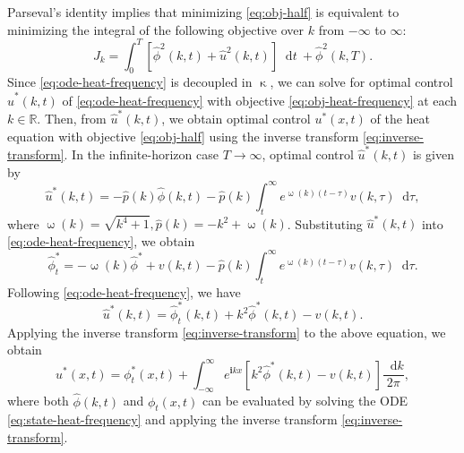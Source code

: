 \documentclass[journal,twoside,web]{ieeecolor}
\newcommand{\RR}{\mathbb{R}}
\newcommand{\state}{\phi}
\newcommand{\statehat}{\hat{\state}}
\newcommand{\im}{\mathbf{i}}
\newcommand*\diff{\mathop{}\!\mathrm{d}}
\newcommand{\wcomplex}{\upomega}
\newcommand{\kcomplex}{\upkappa}
\begin{document}
Parseval's identity implies that minimizing \eqref{eq:obj-half} is equivalent to minimizing the integral of the following objective over $k$ from $-\infty$ to $\infty$:
\begin{equation}\label{eq:obj-heat-frequency}
	J_k =\int_0^T\left[\hat{\state}^2(k,t)+\hat{u}^2(k,t)\right] \diff t\ + \hat{\state}^2(k,T).
\end{equation}
Since \eqref{eq:ode-heat-frequency} is decoupled in $\kcomplex$, we can solve for optimal control $\hat{u}^*(k,t)$ of \eqref{eq:ode-heat-frequency} with objective \eqref{eq:obj-heat-frequency} at each $k\in\RR$. Then,
from $\hat{u}^*(k,t)$, we obtain optimal control $u^*(x,t)$ of the heat equation with objective \eqref{eq:obj-half} using the inverse transform \eqref{eq:inverse-transform}.
In the infinite-horizon case $T\to\infty$, optimal control $\hat{u}^*(k,t)$ is given by
\begin{equation*}
	\hat{u}^*(k,t) = -\hat{p}(k)\statehat(k,t) - \hat{p}(k)\int_{t}^{\infty} e^{\wcomplex(k)(t-\tau)}v(k,\tau)\diff \tau,
\end{equation*}
where $\wcomplex(k)=\sqrt{k^4+1}, \hat{p}(k)=-k^2 + \wcomplex(k)$.
Substituting $\hat{u}^*(k,t)$ into \eqref{eq:ode-heat-frequency}, we obtain
\begin{equation}\label{eq:state-heat-frequency}
		\statehat_t^* = -\wcomplex(k)\statehat^* + v(k,t) - \hat{p}(k)\int_{t}^{\infty} e^{\wcomplex(k)(t-\tau)}v(k,\tau)\diff \tau.
\end{equation}
Following \eqref{eq:ode-heat-frequency}, we have
\begin{equation*}
	\hat{u}^*(k,t) = \statehat_t^* (k,t) +k^2\statehat^*(k,t) - v(k,t).
\end{equation*}
Applying the inverse transform \eqref{eq:inverse-transform} to the above equation, we obtain
\begin{equation}\label{eq:optimal-control-heat}
	u^*(x,t) = \state_t^*(x,t) + \int_{-\infty}^{\infty} e^{\im k x} \left[k^2\statehat^*(k,t)-v(k,t)\right] \frac{\diff k}{2\pi},
\end{equation}
where both $\statehat(k,t)$ and $\state_t(x,t)$ can be evaluated by solving the ODE \eqref{eq:state-heat-frequency} and applying the inverse transform \eqref{eq:inverse-transform}.
\end{document}
